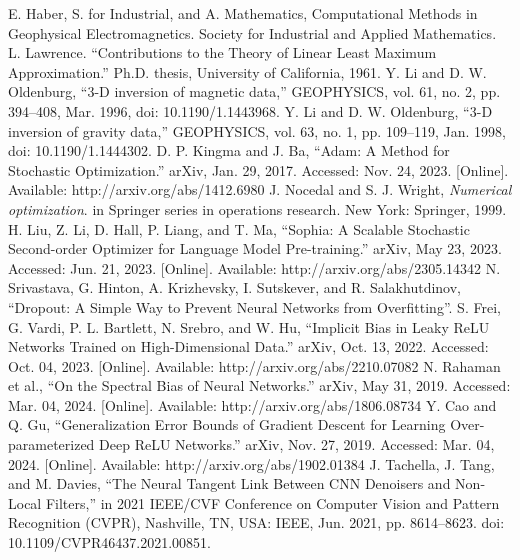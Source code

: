 \documentclass[lettersize,journal]{IEEEtran}
\begin{document}
\begin{thebibliography}{1}
E. Haber, S. for Industrial, and A. Mathematics, Computational Methods in Geophysical Electromagnetics. Society for Industrial and Applied Mathematics.
L. Lawrence. “Contributions to the Theory of Linear Least Maximum Approximation.” Ph.D. thesis, University of California, 1961.
Y. Li and D. W. Oldenburg, “3-D inversion of magnetic data,” GEOPHYSICS, vol. 61, no. 2, pp. 394–408, Mar. 1996, doi: 10.1190/1.1443968.
Y. Li and D. W. Oldenburg, “3-D inversion of gravity data,” GEOPHYSICS, vol. 63, no. 1, pp. 109–119, Jan. 1998, doi: 10.1190/1.1444302.
D. P. Kingma and J. Ba, “Adam: A Method for Stochastic Optimization.” arXiv, Jan. 29, 2017. Accessed: Nov. 24, 2023. [Online]. Available: http://arxiv.org/abs/1412.6980
J. Nocedal and S. J. Wright, \textit{Numerical optimization}. in Springer series in operations research. New York: Springer, 1999.
H. Liu, Z. Li, D. Hall, P. Liang, and T. Ma, “Sophia: A Scalable Stochastic Second-order Optimizer for Language Model Pre-training.” arXiv, May 23, 2023. Accessed: Jun. 21, 2023. [Online]. Available: http://arxiv.org/abs/2305.14342
N. Srivastava, G. Hinton, A. Krizhevsky, I. Sutskever, and R. Salakhutdinov, “Dropout: A Simple Way to Prevent Neural Networks from Overfitting”.
S. Frei, G. Vardi, P. L. Bartlett, N. Srebro, and W. Hu, “Implicit Bias in Leaky ReLU Networks Trained on High-Dimensional Data.” arXiv, Oct. 13, 2022. Accessed: Oct. 04, 2023. [Online]. Available: http://arxiv.org/abs/2210.07082
N. Rahaman et al., “On the Spectral Bias of Neural Networks.” arXiv, May 31, 2019. Accessed: Mar. 04, 2024. [Online]. Available: http://arxiv.org/abs/1806.08734
Y. Cao and Q. Gu, “Generalization Error Bounds of Gradient Descent for Learning Over-parameterized Deep ReLU Networks.” arXiv, Nov. 27, 2019. Accessed: Mar. 04, 2024. [Online]. Available: http://arxiv.org/abs/1902.01384
J. Tachella, J. Tang, and M. Davies, “The Neural Tangent Link Between CNN Denoisers and Non-Local Filters,” in 2021 IEEE/CVF Conference on Computer Vision and Pattern Recognition (CVPR), Nashville, TN, USA: IEEE, Jun. 2021, pp. 8614–8623. doi: 10.1109/CVPR46437.2021.00851.

\end{thebibliography}



\end{document}
